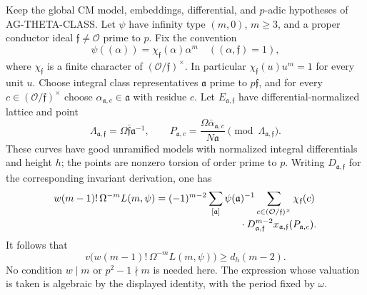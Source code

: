 \begin{proposition}
Keep the global CM model, embeddings, differential, and $p$-adic
hypotheses of AG-THETA-CLASS. Let $\psi$ have infinity type
$(m,0)$, $m\ge3$, and a proper conductor ideal
$\mathfrak f\ne\mathcal O$ prime to $p$. Fix the convention
\[
 \psi((\alpha))=\chi_{\mathfrak f}(\alpha)\alpha^m
 \quad ((\alpha,\mathfrak f)=1),
\]
where $\chi_{\mathfrak f}$ is a finite character of
$(\mathcal O/\mathfrak f)^\times$. In particular
$\chi_{\mathfrak f}(u)u^m=1$ for every unit $u$.
Choose integral class representatives $\mathfrak a$ prime to
$p\mathfrak f$, and for every
$c\in(\mathcal O/\mathfrak f)^\times$ choose
$\alpha_{\mathfrak a,c}\in\mathfrak a$ with residue $c$.
Let $E_{\mathfrak a,\mathfrak f}$ have differential-normalized
lattice and point
\[
 \Lambda_{\mathfrak a,\mathfrak f}
    =\Omega\bar{\mathfrak f}\mathfrak a^{-1},\qquad
 P_{\mathfrak a,c}
    =\frac{\Omega\bar\alpha_{\mathfrak a,c}}{N\mathfrak a}
          \pmod{\Lambda_{\mathfrak a,\mathfrak f}}.
\]
These curves have good unramified models with normalized integral
differentials and height $h$; the points are nonzero torsion of
order prime to $p$. Writing $D_{\mathfrak a,\mathfrak f}$ for
the corresponding invariant derivation, one has
\begin{equation}\label{eq:ag-cm-ray-sum}
 \begin{aligned}
 w(m-1)!\,\Omega^{-m}L(m,\psi)
   ={}&(-1)^{m-2}\sum_{[\mathfrak a]}
         \psi(\mathfrak a)^{-1}
       \sum_{c\in(\mathcal O/\mathfrak f)^\times}
          \chi_{\mathfrak f}(c)\\[-2pt]
     &\hspace{25mm}\cdot
       D_{\mathfrak a,\mathfrak f}^{m-2}
          x_{\mathfrak a,\mathfrak f}(P_{\mathfrak a,c}).
 \end{aligned}
\end{equation}
It follows that
\[
 v\bigl(w(m-1)!\,\Omega^{-m}L(m,\psi)\bigr)
       \ge d_h(m-2).
\]
No condition $w\mid m$ or $p^2-1\nmid m$ is needed here.
The expression whose valuation is taken is algebraic by the
displayed identity, with the period fixed by $\omega$.
\end{proposition}
